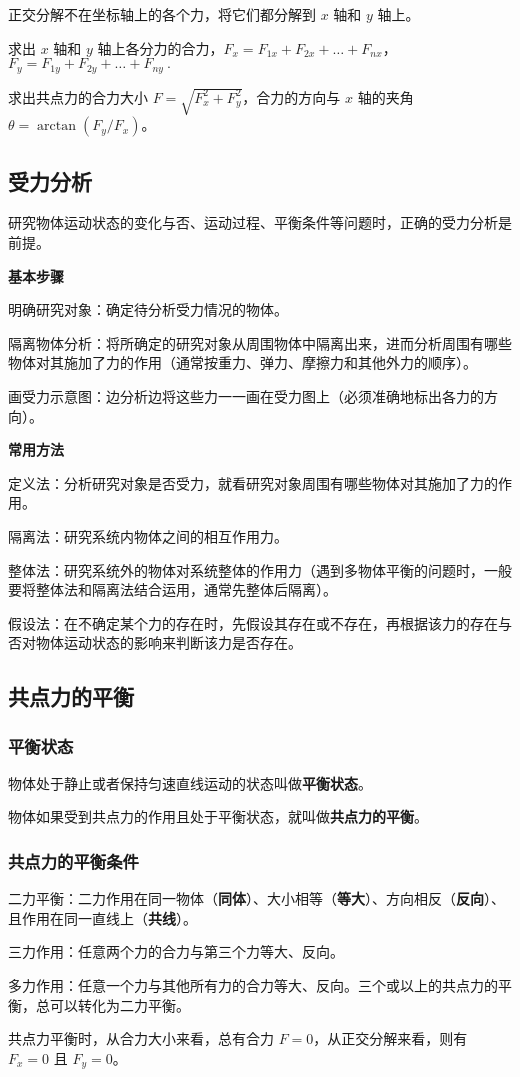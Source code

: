 正交分解不在坐标轴上的各个力，将它们都分解到 $x$ 轴和 $y$ 轴上。

求出 $x$ 轴和 $y$ 轴上各分力的合力，$F_{x}=F_{{1x}}+F_{{2x}}+\dots+F_{{nx}}$，$F_{y}=F_{{1y}}+F_{{2y}}+\dots+F_{{ny}}~.$

求出共点力的合力大小 $F=\sqrt{F_x^2+F_y^2}$，合力的方向与 $x$ 轴的夹角 $\theta=\arctan(F_y/F_x)$。

\subsection{受力分析}
研究物体运动状态的变化与否、运动过程、平衡条件等问题时，正确的受力分析是前提。

\textbf{基本步骤}

明确研究对象：确定待分析受力情况的物体。

隔离物体分析：将所确定的研究对象从周围物体中隔离出来，进而分析周围有哪些物体对其施加了力的作用（通常按重力、弹力、摩擦力和其他外力的顺序）。

画受力示意图：边分析边将这些力一一画在受力图上（必须准确地标出各力的方向）。

\textbf{常用方法}

定义法：分析研究对象是否受力，就看研究对象周围有哪些物体对其施加了力的作用。

隔离法：研究系统内物体之间的相互作用力。

整体法：研究系统外的物体对系统整体的作用力（遇到多物体平衡的问题时，一般要将整体法和隔离法结合运用，通常先整体后隔离）。

假设法：在不确定某个力的存在时，先假设其存在或不存在，再根据该力的存在与否对物体运动状态的影响来判断该力是否存在。

\subsection{共点力的平衡}
\subsubsection{平衡状态}
物体处于静止或者保持匀速直线运动的状态叫做\textbf{平衡状态}。

物体如果受到共点力的作用且处于平衡状态，就叫做\textbf{共点力的平衡}。

\subsubsection{共点力的平衡条件}
二力平衡：二力作用在同一物体（\textbf{同体}）、大小相等（\textbf{等大}）、方向相反（\textbf{反向}）、且作用在同一直线上（\textbf{共线}）。

三力作用：任意两个力的合力与第三个力等大、反向。

多力作用：任意一个力与其他所有力的合力等大、反向。三个或以上的共点力的平衡，总可以转化为二力平衡。

共点力平衡时，从合力大小来看，总有合力 $F=0$，从正交分解来看，则有 $F_x=0$ 且 $F_y=0$。